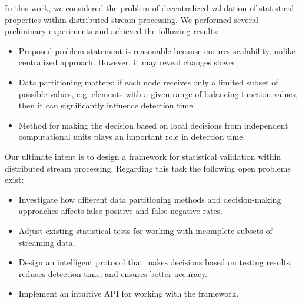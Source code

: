 \label {fs-short-conclusion}

In this work, we considered the problem of decentralized validation of statistical properties within distributed stream processing. We performed several preliminary experiments and achieved the following results:
\begin{itemize}
    \item Proposed problem statement is reasonable because ensures scalability, unlike centralized approach. However, it may reveal changes slower.
    \item Data partitioning matters: if each node receives only a limited subset of possible values, e.g. elements with a given range of balancing function values, then it can significantly influence detection time.
    \item Method for making the decision based on local decisions from independent computational units plays an important role in detection time.
\end{itemize}

Our ultimate intent is to design a framework for statistical validation within distributed stream processing. Regarding this task the following open problems exist:

\begin{itemize}
    \item Investigate how different data partitioning methods and decision-making approaches affects false positive and false negative rates.
    \item Adjust existing statistical tests for working with incomplete subsets of streaming data.
    \item Design an intelligent protocol that makes decisions based on testing results, reduces detection time, and ensures better accuracy.
    \item Implement an intuitive API for working with the framework.
\end{itemize}